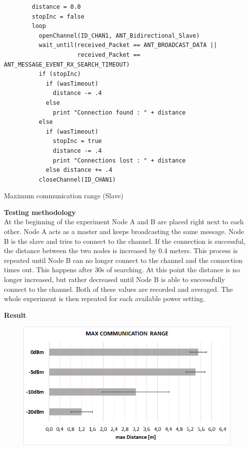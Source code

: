 \begin{description}
	\begin{code}[H]
		\begin{verbatim}
		distance = 0.0
		stopInc = false
		loop 
		  openChannel(ID_CHAN1, ANT_Bidirectional_Slave)
		  wait_until(received_Packet == ANT_BROADCAST_DATA || 
		             received_Packet == ANT_MESSAGE_EVENT_RX_SEARCH_TIMEOUT) 
		  if (stopInc) 
		    if (wasTimeout) 
		      distance -= .4
		    else 
		      print "Connection found : " + distance
		  else
		    if (wasTimeout)  
		      stopInc = true
		      distance -= .4
		      print "Connections lost : " + distance
		    else distance += .4
		  closeChannel(ID_CHAN1)
		\end{verbatim}
		\caption{Maximum communication range (Slave)}\label{lst:sExp6}
	\end{code}
	\item{\textbf{Testing methodology}} \hfill \\ At the beginning of the experiment Node A and B are placed right next to each other. Node A acts as a master and keeps broadcasting the same message. Node B is the slave and tries to connect to the channel. If the connection is successful, the distance between the two nodes is increased by 0.4 meters. This process is repeated until Node B can no longer connect to the channel and the connection times out. This happens after 30s of searching. At this point the distance is no longer increased, but rather decreased until Node B is able to successfully connect to the channel. Both of these values are recorded and averaged. The whole experiment is then repeated for each available power setting.	
	\newpage
	\item{\textbf{Result}} \hfill \\ 
	\begin{figure}[H]
		\centering
		\includegraphics[scale=0.5]{content/images/exp6.png}

\end{figure}
\end{description}
